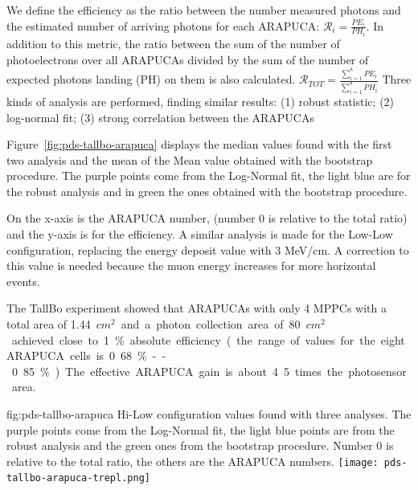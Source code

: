 We define the efficiency as the ratio between the number measured photons and the estimated number of arriving photons for each ARAPUCA:
$\mathcal{R}_{i}=\frac{PE_i}{PH_i}$.
In addition to this metric, the ratio between the sum of the number of photoelectrons over all ARAPUCAs divided by the sum of the number of expected photons landing (PH) on them is also calculated. 
$\mathcal{R}_{TOT}=\frac{\sum_{i=1}^8PE_i}{\sum_{i=1}^8PH_i}$
Three kinds of analysis are performed, finding similar results:
(1) robust statistic; (2) log-normal fit; (3) strong correlation between the ARAPUCAs

Figure~\ref{fig:pds-tallbo-arapuca} displays the median values found with the first two analysis and the mean of the Mean value obtained with the bootstrap procedure.
The purple points come from the Log-Normal fit, the light blue are for the robust analysis and in green the ones obtained with the bootstrap procedure.

On the x-axis is the ARAPUCA number, (number 0 is relative to the total ratio) and the y-axis is
for the efficiency. A similar analysis is made for the Low-Low configuration, replacing the energy deposit value with 3 MeV/cm. A correction to this value is needed because the muon energy increases for more horizontal events.

The TallBo experiment showed that ARAPUCAs with only 4 MPPCs with a total area of \SI{1.44}{$cm^2$} and a photon collection area of \SI{80}{$cm^2$} achieved close to 1\% absolute efficiency (the range of values for the eight ARAPUCA cells is 0.68\%--0.85\%). The effective ARAPUCA gain is about 4.5 times the photosensor area.

\begin{dunefigure}
 {fig:pds-tallbo-arapuca}
 {Hi-Low configuration values found with three analyses. The purple points come
from the Log-Normal fit, the light blue points are from the robust analysis and the green ones from
the bootstrap procedure. Number 0 is relative to the total ratio, the others are the ARAPUCA
numbers.}
\texttt{[image: pds-tallbo-arapuca-trepl.png]}
\end{dunefigure}


